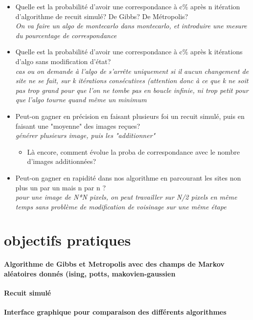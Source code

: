 \documentclass[fleqn]{article} %
\begin{document}
\begin{itemize}
	\item Quelle est la probabilité d'avoir une correspondance à c\% après n itération d'algorithme de recuit simulé? De Gibbs? De Métropolis? \\
		\textit{On va faire un algo de montecarlo dans montecarlo, et introduire une mesure du pourcentage de correspondance}
	\item Quelle est la probabilité d'avoir une correspondance à c\% après k itérations d'algo sans modification d'état?\\
		\textit{cas ou on demande à l'algo de s'arrête uniquement si il aucun changement de site ne se fait, sur k itérations consécutives (attention donc à ce que k ne soit pas trop grand pour que l'on ne tombe pas en boucle infinie, ni trop petit pour que l'algo tourne quand même un minimum}
	\item Peut-on gagner en précision en faisant plusieurs foi un recuit simulé, puis en faisant une "moyenne" des images reçues?\\
		\textit{générer plusieurs image, puis les "additionner"}\\
		\begin{itemize} \item Là encore, comment évolue la proba de correspondance avec le nombre d'images additionnées?	\end{itemize}
	\item Peut-on gagner en rapidité dans nos algorithme en parcourant les sites non plus un par un mais n par n ?\\
		\textit{pour une image de N*N pixels, on peut travailler sur N/2 pixels en même temps sans problème de modification de voisinage sur une même étape}
\end{itemize}

\section{objectifs pratiques}
\paragraph{Algorithme de Gibbs et Metropolis avec des champs de Markov aléatoires donnés (ising, potts, makovien-gaussien}
\paragraph{Recuit simulé}
\paragraph{Interface graphique pour comparaison des différents algorithmes}


\citep{polyrmf}




\end{document}
